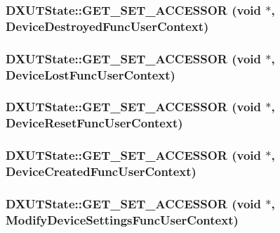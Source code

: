 \label{class_d_x_u_t_state_a651459e8ec073b9e117fc074f3b912b8}
\hypertarget{class_d_x_u_t_state_af72cbdb1d5611c2bc2a9fbd9f2cbc8e8}{
\subsubsection[{GET\_\-SET\_\-ACCESSOR}]{\setlength{\rightskip}{0pt plus 5cm}DXUTState::GET\_\-SET\_\-ACCESSOR (void $\ast$, \/  DeviceDestroyedFuncUserContext)}}
\label{class_d_x_u_t_state_af72cbdb1d5611c2bc2a9fbd9f2cbc8e8}
\hypertarget{class_d_x_u_t_state_afa9670a8127b96cee9404703bb2b023c}{
\subsubsection[{GET\_\-SET\_\-ACCESSOR}]{\setlength{\rightskip}{0pt plus 5cm}DXUTState::GET\_\-SET\_\-ACCESSOR (void $\ast$, \/  DeviceLostFuncUserContext)}}
\label{class_d_x_u_t_state_afa9670a8127b96cee9404703bb2b023c}
\hypertarget{class_d_x_u_t_state_abf5a46fd97695aa026000b33007fb938}{
\subsubsection[{GET\_\-SET\_\-ACCESSOR}]{\setlength{\rightskip}{0pt plus 5cm}DXUTState::GET\_\-SET\_\-ACCESSOR (void $\ast$, \/  DeviceResetFuncUserContext)}}
\label{class_d_x_u_t_state_abf5a46fd97695aa026000b33007fb938}
\hypertarget{class_d_x_u_t_state_a9eee36fb8df18717939c93fb0a9d5be6}{
\subsubsection[{GET\_\-SET\_\-ACCESSOR}]{\setlength{\rightskip}{0pt plus 5cm}DXUTState::GET\_\-SET\_\-ACCESSOR (void $\ast$, \/  DeviceCreatedFuncUserContext)}}
\label{class_d_x_u_t_state_a9eee36fb8df18717939c93fb0a9d5be6}
\hypertarget{class_d_x_u_t_state_a5a076c00ff8b66a490d7dd6036df0e46}{
\subsubsection[{GET\_\-SET\_\-ACCESSOR}]{\setlength{\rightskip}{0pt plus 5cm}DXUTState::GET\_\-SET\_\-ACCESSOR (void $\ast$, \/  ModifyDeviceSettingsFuncUserContext)}}
